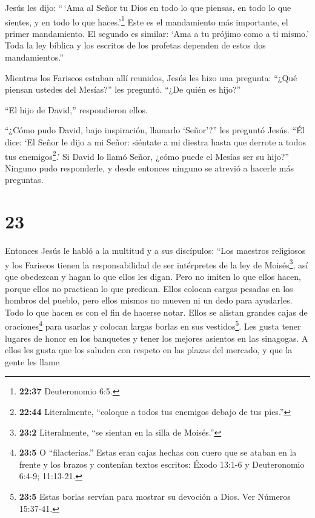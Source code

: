  Jesús les dijo: ``\,`Ama al Señor tu Dios en todo lo que
piensas, en todo lo que sientes, y en todo lo que haces.'\footnote{\textbf{22:37}
  Deuteronomio 6:5.}  Este es el mandamiento más
importante, el primer mandamiento.  El segundo es similar:
`Ama a tu prójimo como a ti mismo.'  Toda la ley bíblica y
los escritos de los profetas dependen de estos dos mandamientos.''

 Mientras los Fariseos estaban allí reunidos, Jesús les
hizo una pregunta:  ``¿Qué piensan ustedes del Mesías?''
les preguntó. ``¿De quién es hijo?''

``El hijo de David,'' respondieron ellos.

 ``¿Cómo pudo David, bajo inspiración, llamarlo `Señor'?''
les preguntó Jesús. ``Él dice:  `El Señor le dijo a mi
Señor: siéntate a mi diestra hasta que derrote a todos tus
enemigos\footnote{\textbf{22:44} Literalmente, ``coloque a todos tus
  enemigos debajo de tus pies.''}.'  Si David lo llamó
Señor, ¿cómo puede el Mesías ser su hijo?''  Ninguno pudo
responderle, y desde entonces ninguno se atrevió a hacerle más
preguntas.

\hypertarget{section-22}{%
\section{23}\label{section-22}}

 Entonces Jesús le habló a la multitud y a sus discípulos:
 ``Los maestros religiosos y los Fariseos tienen la
responsabilidad de ser intérpretes de la ley de Moisés\footnote{\textbf{23:2}
  Literalmente, ``se sientan en la silla de Moisés.''},  así
que obedezcan y hagan lo que ellos les digan. Pero no imiten lo que
ellos hacen, porque ellos no practican lo que predican. 
Ellos colocan cargas pesadas en los hombros del pueblo, pero ellos
mismos no mueven ni un dedo para ayudarles.  Todo lo que
hacen es con el fin de hacerse notar. Ellos se alistan grandes cajas de
oraciones\footnote{\textbf{23:5} O ``filacterias.'' Estas eran cajas
  hechas con cuero que se ataban en la frente y los brazos y contenían
  textos escritos: Éxodo 13:1-6 y Deuteronomio 6:4-9; 11:13-21.} para
usarlas y colocan largas borlas en sus vestidos\footnote{\textbf{23:5}
  Estas borlas servían para mostrar su devoción a Dios. Ver Números
  15:37-41.}.  Les gusta tener lugares de honor en los
banquetes y tener los mejores asientos en las sinagogas.  A
ellos les gusta que los saluden con respeto en las plazas del mercado, y
que la gente les llame

